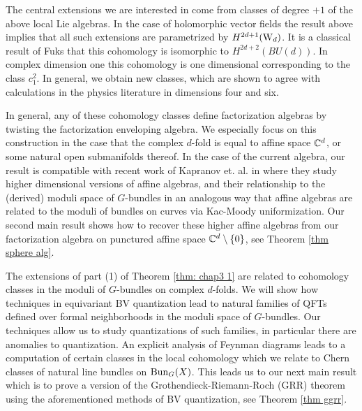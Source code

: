 The central extensions we are interested in come from classes of degree $+1$ of the above local Lie algebras.
In the case of holomorphic vector fields the result above implies that all such extensions are parametrized by $H^{2d+1}({\rm W}_d)$. 
It is a classical result of Fuks \cite{Fuks} that this cohomology is isomorphic to $H^{2d+2}(BU(d))$. 
In complex dimension one this cohomology is one dimensional corresponding to the class $c_1^2$. 
In general, we obtain new classes, which are shown to agree with calculations in the physics 
literature in dimensions four and six. 

In general, any of these cohomology classes define factorization algebras by twisting the factorization enveloping algebra. 
We especially focus on this construction in the case that the complex $d$-fold is equal to affine space $\mathbb C^d$, or some natural open submanifolds thereof.
In the case of the current algebra, our result is compatible with recent work of Kapranov et. al. in \cite{FHK} where they study higher dimensional versions of affine algebras, and their relationship to the (derived) moduli space of $G$-bundles in an analogous way that affine algebras are related to the moduli of bundles on curves via Kac-Moody uniformization.  
Our second main result shows how to recover these higher affine algebras from our factorization algebra on punctured affine space $\mathbb C^d \setminus\{0\}$, see Theorem \ref{thm sphere alg}.

The extensions of part (1) of Theorem \ref{thm: chap3 1} are related to cohomology classes in the moduli of $G$-bundles on complex $d$-folds.
We will show how techniques in equivariant BV quantization lead to natural families of QFTs defined over formal neighborhoods in the moduli space of $G$-bundles. 
Our techniques allow us to study quantizations of such families, in particular there are anomalies to quantization. 
An explicit analysis of Feynman diagrams leads to a computation of certain classes in the local cohomology which we relate to Chern classes of natural line bundles on ${\rm Bun}_G(X)$.
This leads us to our next main result which is to prove a version of the Grothendieck-Riemann-Roch (GRR) theorem using the aforementioned methods of BV quantization, see Theorem \ref{thm ggrr}.


